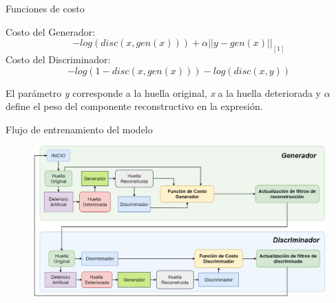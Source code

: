 \documentclass[12pt,aspectratio=169]{beamer}
\begin{document}
\begin{frame}{Funciones de costo}

    Costo del Generador:
    \begin{equation}
        - log(disc(x,gen(x)))+\alpha||y-gen(x)||_{[1]}
    \end{equation}
    Costo del Discriminador:
    \begin{equation}
        -log(1-disc(x,gen(x)))-log(disc(x,y))
    \end{equation}
    
    \vspace{5mm}
    
    El parámetro \textit{y} corresponde a la huella original, \textit{x} a la huella deteriorada y $\alpha$ define el peso del componente reconstructivo en la expresión.

\end{frame}

\begin{frame}{Flujo de entrenamiento del modelo}

    \begin{figure}
        \includegraphics[scale=0.25]{figs/training_flow_overall.png}
    \end{figure}

\end{frame}
\end{document}
